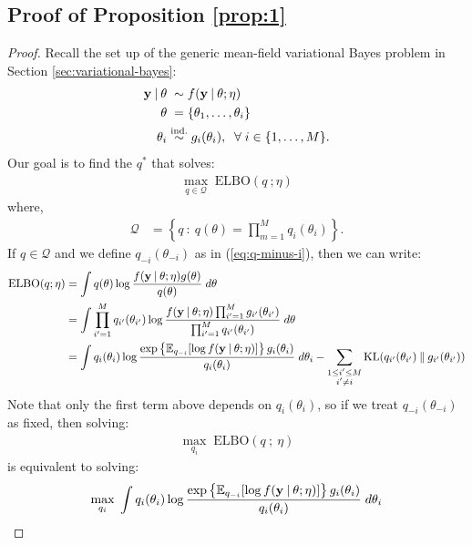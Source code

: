 \subsection{Proof of Proposition \ref{prop:1}}
\label{app:prop1-proof}

\begin{proof}

Recall the set up of the generic mean-field variational Bayes problem in Section \ref{sec:variational-bayes}:
\begin{align*}
    \mathbf{y} \:|\: \theta &\;\sim f(\mathbf{y}\:|\: \theta;\eta) \\ 
    \theta &\;= \{\theta_1, \ldots, \theta_i\} \\
    \theta_i &\overset{\text{ind.}}{\sim} g_i(\theta_i),\; \;\forall\; i \in \{1, \ldots, M\}.
\end{align*}
Our goal is to find the $q^*$ that solves:
\begin{align*}
    \max_{q\in\mathcal{Q}}  \; \text{ELBO}( q \:; \eta)
\end{align*}
where,
\begin{align*} 
    \mathcal{Q} &= \left\{q \::\: q(\theta) = \prod_{m=1}^M q_i(\theta_i)\right\}.
\end{align*}
If $q \in \mathcal{Q}$ and we define $q_{-i}(\theta_{-i})$ as in (\ref{eq:q-minus-i}), then we can write:
\begin{align*}
    \text{ELBO}(q;\eta) &= \int q(\theta) \log \frac{f(\mathbf{y}\:|\: \theta;\eta) g(\theta)}{q(\theta)} \; d\theta \\
    &= \int \prod_{i'=1}^M q_{i'}(\theta_{i'}) \log \frac{ f(\mathbf{y}\:|\: \theta;\eta) \prod_{i'=1}^M g_{i'}(\theta_{i'})}{\prod_{i'=1}^M q_{i'}(\theta_{i'})} \; d\theta \\
    &= \int q_{i}(\theta_i) \log \frac{\exp\left\{\mathbb{E}_{q_{-i}}[\log f(\mathbf{y}\:|\: \theta;\eta)]\right\}g_{i}(\theta_i)}{q_{i}(\theta_i)} \; d\theta_i - \sum_{\substack{1 \leq i' \leq M \\ i' \neq i}} \text{KL}(q_{i'}(\theta_{i'})\:\lVert\: g_{i'}(\theta_{i'}))
\end{align*}
Note that only the first term above depends on $q_i(\theta_i)$, so if we treat $q_{-i}(\theta_{-i})$ as fixed, then solving: 
\begin{align}
    \max_{q_i}  \; \text{ELBO}( q \:;\: \eta) \label{eq:max-elbo-m}
\end{align}
is equivalent to solving:
\begin{align*}
    \max_{q_i}  \; \int q_{i}(\theta_i) \log \frac{\exp\left\{\E_{q_{-i}}[\log f(\mathbf{y}\:|\: \theta;\eta)]\right\}g_{i}(\theta_i)}{q_{i}(\theta_i)} \; d\theta_i

\end{align*}
\end{proof}
